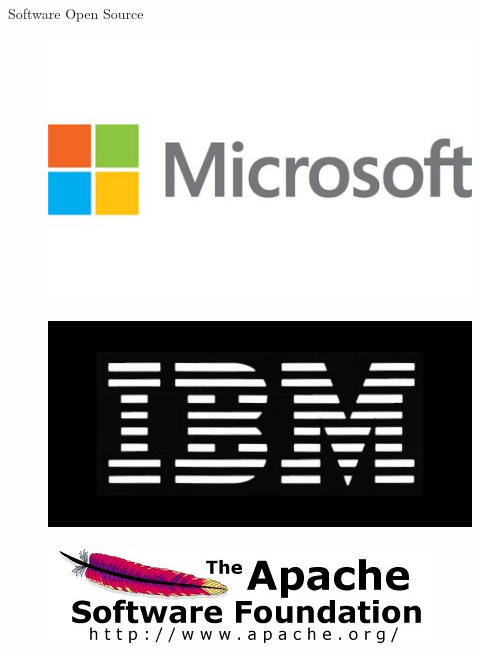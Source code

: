\begin{frame}{Software Open Source}
   \begin{figure}[hb]
     \centering
     \includegraphics[scale=0.2]{microsoft-logo.jpg}
     \label{fig14:ms}
   \end{figure}

   \begin{figure}[hb]
     \centering
     \includegraphics[scale=0.1]{IBM-logo.jpg}
     \label{fig15:ibm}
   \end{figure}

   \begin{figure}[hb]
     \centering
     \includegraphics[scale=0.2]{asf-logo.jpg}
     \label{fig16:afs}
   \end{figure}


\end{frame}
